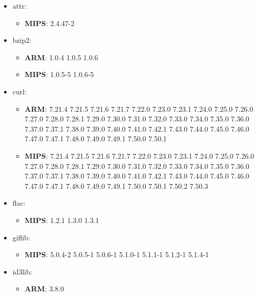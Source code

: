 \documentclass[twocolumn,a4paper]{IEEEtran} %
\begin{document}
\scriptsize
\begin{itemize}[noitemsep,topsep=0pt,parsep=0pt,partopsep=0pt]
\item attr:
\begin{itemize}[noitemsep,topsep=0pt,parsep=0pt,partopsep=0pt]
  \item \textbf{MIPS}: 2.4.47-2
\end{itemize}

\item bzip2:
\begin{itemize}[noitemsep,topsep=0pt,parsep=0pt,partopsep=0pt]
  \item \textbf{ARM}: 1.0.4 1.0.5 1.0.6
  \item \textbf{MIPS}: 1.0.5-5 1.0.6-5
\end{itemize}

\item curl:
\begin{itemize}[noitemsep,topsep=0pt,parsep=0pt,partopsep=0pt]
  \item \textbf{ARM}: 7.21.4 7.21.5 7.21.6 7.21.7 7.22.0 7.23.0 7.23.1 7.24.0 7.25.0 7.26.0 7.27.0 7.28.0 7.28.1 7.29.0 7.30.0 7.31.0 7.32.0 7.33.0 7.34.0 7.35.0 7.36.0 7.37.0 7.37.1 7.38.0 7.39.0 7.40.0 7.41.0 7.42.1 7.43.0 7.44.0 7.45.0 7.46.0 7.47.0 7.47.1 7.48.0 7.49.0 7.49.1 7.50.0 7.50.1
  \item \textbf{MIPS}: 7.21.4 7.21.5 7.21.6 7.21.7 7.22.0 7.23.0 7.23.1 7.24.0 7.25.0 7.26.0 7.27.0 7.28.0 7.28.1 7.29.0 7.30.0 7.31.0 7.32.0 7.33.0 7.34.0 7.35.0 7.36.0 7.37.0 7.37.1 7.38.0 7.39.0 7.40.0 7.41.0 7.42.1 7.43.0 7.44.0 7.45.0 7.46.0 7.47.0 7.47.1 7.48.0 7.49.0 7.49.1 7.50.0 7.50.1 7.50.2 7.50.3
\end{itemize}

\item flac:
\begin{itemize}[noitemsep,topsep=0pt,parsep=0pt,partopsep=0pt]
  \item \textbf{MIPS}: 1.2.1 1.3.0 1.3.1
\end{itemize}

\item giflib:
\begin{itemize}[noitemsep,topsep=0pt,parsep=0pt,partopsep=0pt]
  \item \textbf{MIPS}: 5.0.4-2 5.0.5-1 5.0.6-1 5.1.0-1 5.1.1-1 5.1.2-1 5.1.4-1
\end{itemize}

\item id3lib:
\begin{itemize}[noitemsep,topsep=0pt,parsep=0pt,partopsep=0pt]
  \item \textbf{ARM}: 3.8.0
\end{itemize}


\end{itemize}
\end{document}
